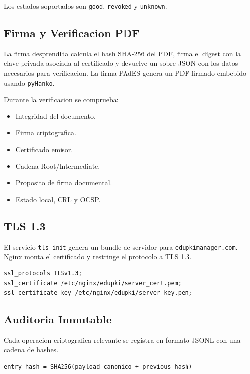 \documentclass[12pt,a4paper]{article}
\begin{document}
Los estados soportados son \texttt{good}, \texttt{revoked} y \texttt{unknown}.

\subsection{Firma y Verificacion PDF}

La firma desprendida calcula el hash SHA-256 del PDF, firma el digest con la clave privada asociada al certificado y devuelve un sobre JSON con los datos necesarios para verificacion. La firma PAdES genera un PDF firmado embebido usando \texttt{pyHanko}.

Durante la verificacion se comprueba:

\begin{itemize}[leftmargin=*]
    \item Integridad del documento.
    \item Firma criptografica.
    \item Certificado emisor.
    \item Cadena Root/Intermediate.
    \item Proposito de firma documental.
    \item Estado local, CRL y OCSP.
\end{itemize}

\subsection{TLS 1.3}

El servicio \texttt{tls\_init} genera un bundle de servidor para \texttt{edupkimanager.com}. Nginx monta el certificado y restringe el protocolo a TLS 1.3.

\begin{lstlisting}[style=code]
ssl_protocols TLSv1.3;
ssl_certificate /etc/nginx/edupki/server_cert.pem;
ssl_certificate_key /etc/nginx/edupki/server_key.pem;
\end{lstlisting}

\subsection{Auditoria Inmutable}

Cada operacion criptografica relevante se registra en formato JSONL con una cadena de hashes.

\begin{lstlisting}[style=code]
entry_hash = SHA256(payload_canonico + previous_hash)
\end{lstlisting}
\end{document}
